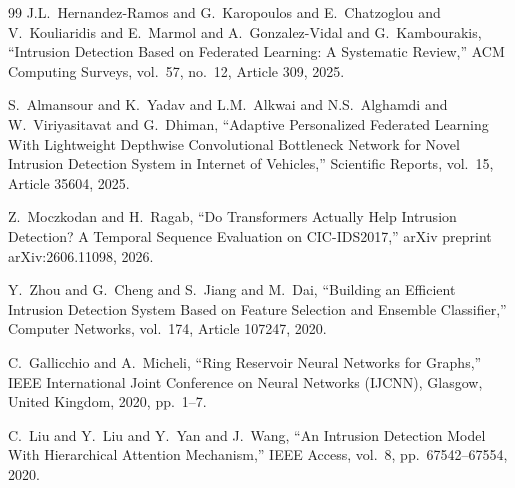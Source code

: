 \documentclass[5p,times]{elsarticle}
\begin{document}
\begin{thebibliography}{99}
		J.L.\ Hernandez-Ramos and G.\ Karopoulos and E.\ Chatzoglou and V.\ Kouliaridis and E.\ Marmol and A.\ Gonzalez-Vidal and G.\ Kambourakis,
		``Intrusion Detection Based on Federated Learning: A Systematic Review,''
		ACM Computing Surveys,
		vol.\ 57,
		no.\ 12,
		Article 309,
		2025.
		
		S.\ Almansour and K.\ Yadav and L.M.\ Alkwai and N.S.\ Alghamdi and W.\ Viriyasitavat and G.\ Dhiman,
		``Adaptive Personalized Federated Learning With Lightweight Depthwise Convolutional Bottleneck Network for Novel Intrusion Detection System in Internet of Vehicles,''
		Scientific Reports,
		vol.\ 15,
		Article 35604,
		2025.
		
		Z.\ Moczkodan and H.\ Ragab,
		``Do Transformers Actually Help Intrusion Detection? A Temporal Sequence Evaluation on CIC-IDS2017,''
		arXiv preprint arXiv:2606.11098,
		2026.
		
		Y.\ Zhou and G.\ Cheng and S.\ Jiang and M.\ Dai,
		``Building an Efficient Intrusion Detection System Based on Feature Selection and Ensemble Classifier,''
		Computer Networks,
		vol.\ 174,
		Article 107247,
		2020.
		
		C.\ Gallicchio and A.\ Micheli,
		``Ring Reservoir Neural Networks for Graphs,''
		IEEE International Joint Conference on Neural Networks (IJCNN),
		Glasgow, United Kingdom,
		2020,
		pp.\ 1--7.
		
		C.\ Liu and Y.\ Liu and Y.\ Yan and J.\ Wang,
		``An Intrusion Detection Model With Hierarchical Attention Mechanism,''
		IEEE Access,
		vol.\ 8,
		pp.\ 67542--67554,
		2020.
		
	\end{thebibliography}
\end{document}
